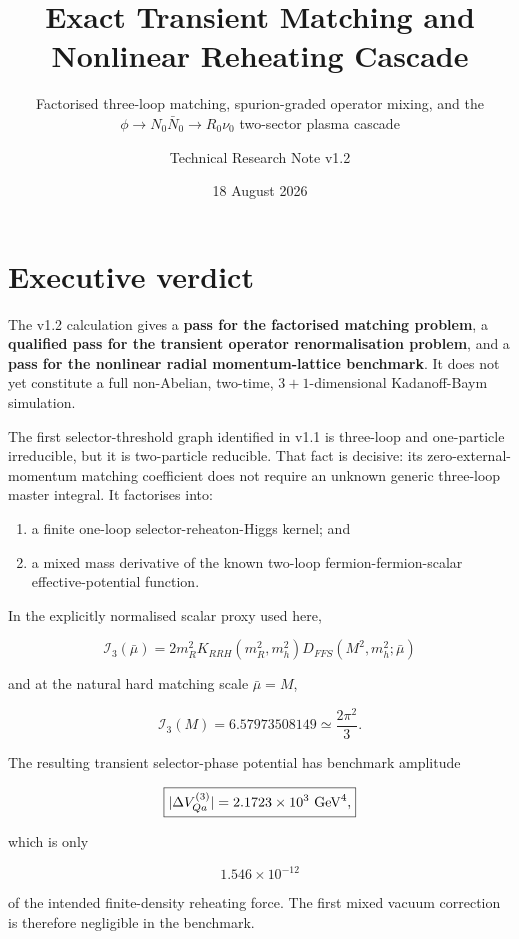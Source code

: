 \documentclass[
  10pt,
]{article}
\title{Exact Transient Matching and Nonlinear Reheating Cascade}
\subtitle{Factorised three-loop matching, spurion-graded operator
mixing, and the \(\phi\to N_0\bar N_0\to R_0\nu_0\) two-sector plasma
cascade}
\author{Technical Research Note v1.2}
\date{18 August 2026}
\providecommand{\tightlist}{%
  \setlength{\itemsep}{0pt}\setlength{\parskip}{0pt}}
\begin{document}
\maketitle

{
\hypersetup{linkcolor=}
\setcounter{tocdepth}{3}
\tableofcontents
}
\section{Executive verdict}\label{executive-verdict}

The v1.2 calculation gives a \textbf{pass for the factorised matching
problem}, a \textbf{qualified pass for the transient operator
renormalisation problem}, and a \textbf{pass for the nonlinear radial
momentum-lattice benchmark}. It does not yet constitute a full
non-Abelian, two-time, \(3+1\)-dimensional Kadanoff-Baym simulation.

The first selector-threshold graph identified in v1.1 is three-loop and
one-particle irreducible, but it is two-particle reducible. That fact is
decisive: its zero-external-momentum matching coefficient does not
require an unknown generic three-loop master integral. It factorises
into:

\begin{enumerate}
\def\labelenumi{\arabic{enumi}.}
\tightlist
\item
  a finite one-loop selector-reheaton-Higgs kernel; and
\item
  a mixed mass derivative of the known two-loop fermion-fermion-scalar
  effective-potential function.
\end{enumerate}

In the explicitly normalised scalar proxy used here,

\[
\boxed{
\mathcal I_3(\bar\mu)
=
2m_R^2K_{RRH}(m_R^2,m_h^2)
D_{FFS}(M^2,m_h^2;\bar\mu)
}
\]

and at the natural hard matching scale \(\bar\mu=M\),

\[
\boxed{
\mathcal I_3(M)=6.57973508149
\simeq
\frac{2\pi^2}{3}.
}
\]

The resulting transient selector-phase potential has benchmark amplitude

\[
\boxed{
|\Delta V_{Qa}^{(3)}|
=2.1723\times10^3\ {\rm GeV}^4,
}
\]

which is only

\[
\boxed{
1.546\times10^{-12}
}
\]

of the intended finite-density reheating force. The first mixed vacuum
correction is therefore negligible in the benchmark.
\end{document}
